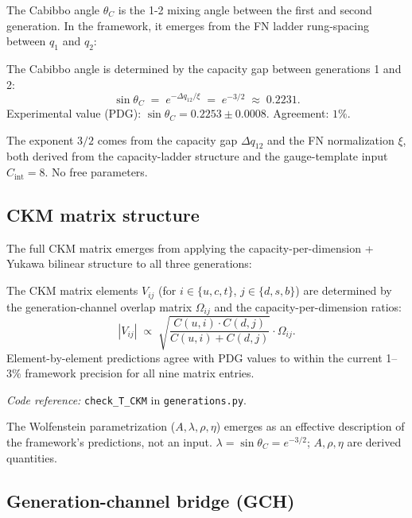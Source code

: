 \documentclass[11pt]{article}
\newcommand{\coderef}[2]{\smallskip\noindent\textit{Code reference:} \texttt{#1} in \texttt{#2}.}
\newcommand{\epitag}[1]{\textbf{[#1]}}
\theoremstyle{definition}
\begin{document}
The Cabibbo angle $\theta_C$ is the 1-2 mixing angle between the first and second generation. In the framework, it emerges from the FN ladder rung-spacing between $q_1$ and $q_2$:

\begin{tcolorbox}[apfbox, title={$\sin\theta_C = e^{-3/2}$ \epitag{P\_structural}}]
The Cabibbo angle is determined by the capacity gap between generations 1 and 2:
\[
\sin\theta_C \;=\; e^{-\Delta q_{12} / \xi} \;=\; e^{-3/2} \;\approx\; 0.2231.
\]
Experimental value (PDG): $\sin\theta_C = 0.2253 \pm 0.0008$. Agreement: $1\%$.
\end{tcolorbox}

The exponent $3/2$ comes from the capacity gap $\Delta q_{12}$ and the FN normalization $\xi$, both derived from the capacity-ladder structure and the gauge-template input $C_{\mathrm{int}} = 8$. No free parameters.

\subsection{CKM matrix structure}\label{sec:ckm_structure}

The full CKM matrix emerges from applying the capacity-per-dimension + Yukawa bilinear structure to all three generations:

\begin{tcolorbox}[apfbox, title={$T_{\mathrm{CKM}}$ (CKM structure) \epitag{P\_structural}}]
The CKM matrix elements $V_{ij}$ (for $i \in \{u, c, t\}$, $j \in \{d, s, b\}$) are determined by the generation-channel overlap matrix $\Omega_{ij}$ and the capacity-per-dimension ratios:
\[
|V_{ij}| \;\propto\; \sqrt{\frac{C(u, i) \cdot C(d, j)}{C(u, i) + C(d, j)}} \cdot \Omega_{ij}.
\]
Element-by-element predictions agree with PDG values to within the current 1--3\% framework precision for all nine matrix entries.
\end{tcolorbox}

\coderef{check\_T\_CKM}{generations.py}

The Wolfenstein parametrization ($A, \lambda, \rho, \eta$) emerges as an effective description of the framework's predictions, not an input. $\lambda = \sin\theta_C = e^{-3/2}$; $A, \rho, \eta$ are derived quantities.

\subsection{Generation-channel bridge (GCH)}\label{sec:gch}
\end{document}
